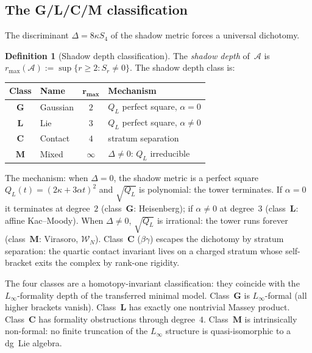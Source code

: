 \documentclass[11pt,reqno]{amsart}
\theoremstyle{definition}
\newtheorem{definition}[theorem]{Definition}
\theoremstyle{remark}
\providecommand{\cA}{\mathcal{A}}
\numberwithin{equation}{section}
\begin{document}
\subsection{The G/L/C/M classification}
\label{ssec:glcm}

The discriminant $\Delta = 8\kappa S_4$ of the shadow
metric forces a universal dichotomy.

\begin{definition}[Shadow depth classification]
\label{def:shadow-depth}
The \emph{shadow depth} of~$\cA$ is
$r_{\max}(\cA) := \sup\{r \ge 2 : S_r \ne 0\}$.
The shadow depth class is:
\begin{center}
\renewcommand{\arraystretch}{1.2}
\begin{tabular}{clcl}
\toprule
\textbf{Class} & \textbf{Name} &
 $\boldsymbol{r_{\max}}$ & \textbf{Mechanism} \\
\midrule
$\mathbf{G}$ & Gaussian &
 $2$ & $Q_L$ perfect square, $\alpha = 0$ \\
$\mathbf{L}$ & Lie &
 $3$ & $Q_L$ perfect square, $\alpha \ne 0$ \\
$\mathbf{C}$ & Contact &
 $4$ & stratum separation \\
$\mathbf{M}$ & Mixed &
 $\infty$ & $\Delta \ne 0$: $Q_L$ irreducible \\
\bottomrule
\end{tabular}
\end{center}
\end{definition}

The mechanism: when $\Delta = 0$, the shadow metric is a
perfect square $Q_L(t) = (2\kappa + 3\alpha t)^2$ and
$\sqrt{Q_L}$ is polynomial: the tower terminates.
If $\alpha = 0$ it terminates at degree~$2$ (class~$\mathbf{G}$:
Heisenberg); if $\alpha \ne 0$ at degree~$3$
(class~$\mathbf{L}$: affine Kac--Moody). When
$\Delta \ne 0$, $\sqrt{Q_L}$ is irrational: the tower
runs forever (class~$\mathbf{M}$: Virasoro,
$\mathcal{W}_N$). Class~$\mathbf{C}$ ($\beta\gamma$)
escapes the dichotomy by stratum separation: the quartic
contact invariant lives on a charged stratum whose
self-bracket exits the complex by rank-one rigidity.

The four classes are a homotopy-invariant classification:
they coincide with the $L_\infty$-formality depth of the
transferred minimal model. Class~$\mathbf{G}$ is
$L_\infty$-formal (all higher brackets vanish).
Class~$\mathbf{L}$ has exactly one nontrivial Massey
product. Class~$\mathbf{C}$ has formality obstructions
through degree~$4$. Class~$\mathbf{M}$ is intrinsically
non-formal: no finite truncation of the $L_\infty$
structure is quasi-isomorphic to a dg~Lie algebra.
\end{document}
